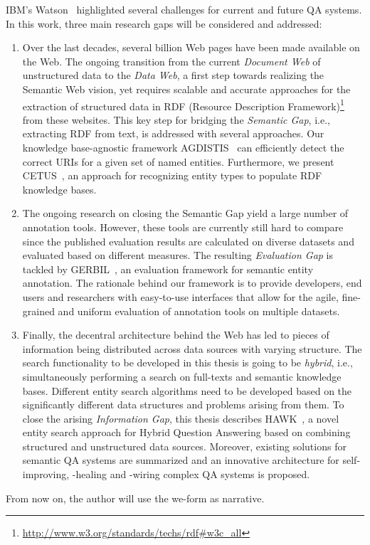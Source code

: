 IBM's Watson~\cite{watson} highlighted several challenges for current and future QA systems.
In this work, three main research gaps will be considered and addressed:
\begin{enumerate}
\item 
Over the last decades, several billion Web pages have been made available on the Web. 
The ongoing transition from the current \emph{Document Web} of unstructured data to the \emph{Data Web}, a first step towards realizing the Semantic Web vision, yet requires scalable and accurate approaches for the extraction of structured data in RDF (Resource Description Framework)\footnote{\url{http://www.w3.org/standards/techs/rdf\#w3c_all}} from these websites.
This key step for bridging the \emph{Semantic Gap}, i.e., extracting RDF from text, is addressed  with several approaches.
Our knowledge base-agnostic framework AGDISTIS~\cite{agdistis_iswc} can efficiently detect the correct URIs for a given set of named entities.
Furthermore, we present CETUS~\cite{CETUS_2015}, an approach for recognizing entity types to populate RDF knowledge bases. 
\item 
The ongoing research on closing the Semantic Gap yield a large number of annotation tools.
However, these tools are currently still hard to compare since the published evaluation results are calculated on diverse datasets and evaluated based on different measures.
The resulting \emph{Evaluation Gap} is tackled by GERBIL~\cite{GERBIL}, an evaluation framework for semantic entity annotation. The rationale behind our framework is to provide developers, end users and researchers with easy-to-use interfaces that allow for the agile, fine-grained and uniform evaluation of annotation tools on multiple datasets.
\item 
Finally, the decentral architecture behind the Web has led to pieces of information being distributed across data sources with varying structure. 
The search functionality to be developed in this thesis is going to be \emph{hybrid}, i.e., simultaneously performing a search on full-texts and semantic knowledge bases.
Different entity search algorithms need to be developed based on the significantly different data structures and problems arising from them. 
To close the arising \emph{Information Gap}, this thesis describes HAWK~\cite{hawk_2015}, a novel entity search approach for Hybrid Question Answering based on combining structured and unstructured data sources.
Moreover, existing solutions for semantic QA systems are summarized and an innovative architecture for self-improving, -healing and -wiring complex QA systems is proposed.
\end{enumerate}
From now on, the author will use the we-form as narrative.


